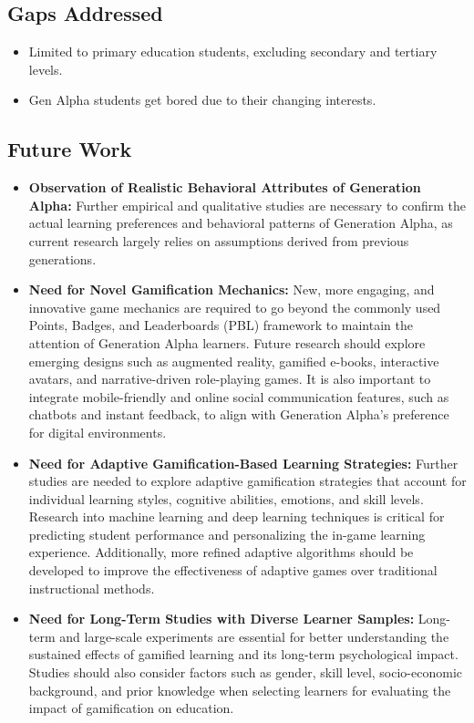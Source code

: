\subsection{Gaps Addressed}
\begin{itemize}
    \item Limited to primary education students, excluding secondary and tertiary levels.
    \item Gen Alpha students get bored due to their changing interests.
\end{itemize}

\subsection{Future Work}

\begin{itemize}
    \item \textbf{Observation of Realistic Behavioral Attributes of Generation Alpha:}
    Further empirical and qualitative studies are necessary to confirm the actual learning preferences and behavioral patterns of Generation Alpha, as current research largely relies on assumptions derived from previous generations.

    \item \textbf{Need for Novel Gamification Mechanics:}
    New, more engaging, and innovative game mechanics are required to go beyond the commonly used Points, Badges, and Leaderboards (PBL) framework to maintain the attention of Generation Alpha learners.
    Future research should explore emerging designs such as augmented reality, gamified e-books, interactive avatars, and narrative-driven role-playing games. It is also important to integrate mobile-friendly and online social communication features, such as chatbots and instant feedback, to align with Generation Alpha's preference for digital environments.

    \item \textbf{Need for Adaptive Gamification-Based Learning Strategies:}
    Further studies are needed to explore adaptive gamification strategies that account for individual learning styles, cognitive abilities, emotions, and skill levels. Research into machine learning and deep learning techniques is critical for predicting student performance and personalizing the in-game learning experience. Additionally, more refined adaptive algorithms should be developed to improve the effectiveness of adaptive games over traditional instructional methods.

    \item \textbf{Need for Long-Term Studies with Diverse Learner Samples:}
    Long-term and large-scale experiments are essential for better understanding the sustained effects of gamified learning and its long-term psychological impact. Studies should also consider factors such as gender, skill level, socio-economic background, and prior knowledge when selecting learners for evaluating the impact of gamification on education.
\end{itemize}

